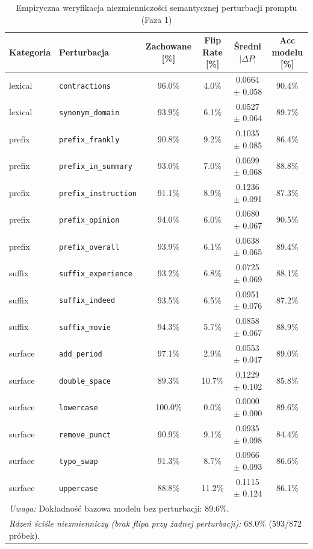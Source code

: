 \begin{table}[htbp]
\centering
\caption{Empiryczna weryfikacja niezmienniczości semantycznej perturbacji promptu (Faza 1)}
\label{tab:perturbation_validation}
\begin{tabular}{llcccc}
\hline
\textbf{Kategoria} & \textbf{Perturbacja} & \textbf{Zachowane [\%]} & \textbf{Flip Rate [\%]} & \textbf{Średni $|\Delta P|$} & \textbf{Acc modelu [\%]} \\
\hline
lexical & \texttt{contractions} & 96.0\% & 4.0\% & 0.0664 $\pm$ 0.058 & 90.4\% \\
lexical & \texttt{synonym\_domain} & 93.9\% & 6.1\% & 0.0527 $\pm$ 0.064 & 89.7\% \\
prefix & \texttt{prefix\_frankly} & 90.8\% & 9.2\% & 0.1035 $\pm$ 0.085 & 86.4\% \\
prefix & \texttt{prefix\_in\_summary} & 93.0\% & 7.0\% & 0.0699 $\pm$ 0.068 & 88.8\% \\
prefix & \texttt{prefix\_instruction} & 91.1\% & 8.9\% & 0.1236 $\pm$ 0.091 & 87.3\% \\
prefix & \texttt{prefix\_opinion} & 94.0\% & 6.0\% & 0.0680 $\pm$ 0.067 & 90.5\% \\
prefix & \texttt{prefix\_overall} & 93.9\% & 6.1\% & 0.0638 $\pm$ 0.065 & 89.4\% \\
suffix & \texttt{suffix\_experience} & 93.2\% & 6.8\% & 0.0725 $\pm$ 0.069 & 88.1\% \\
suffix & \texttt{suffix\_indeed} & 93.5\% & 6.5\% & 0.0951 $\pm$ 0.076 & 87.2\% \\
suffix & \texttt{suffix\_movie} & 94.3\% & 5.7\% & 0.0858 $\pm$ 0.067 & 88.9\% \\
surface & \texttt{add\_period} & 97.1\% & 2.9\% & 0.0553 $\pm$ 0.047 & 89.0\% \\
surface & \texttt{double\_space} & 89.3\% & 10.7\% & 0.1229 $\pm$ 0.102 & 85.8\% \\
surface & \texttt{lowercase} & 100.0\% & 0.0\% & 0.0000 $\pm$ 0.000 & 89.6\% \\
surface & \texttt{remove\_punct} & 90.9\% & 9.1\% & 0.0935 $\pm$ 0.098 & 84.4\% \\
surface & \texttt{typo\_swap} & 91.3\% & 8.7\% & 0.0966 $\pm$ 0.093 & 86.6\% \\
surface & \texttt{uppercase} & 88.8\% & 11.2\% & 0.1115 $\pm$ 0.124 & 86.1\% \\
\hline
\multicolumn{6}{l}{\footnotesize \textit{Uwaga:} Dokładność bazowa modelu bez perturbacji: 89.6\%.} \\
\multicolumn{6}{l}{\footnotesize \textit{Rdzeń ściśle niezmienniczy (brak flipa przy żadnej perturbacji):} 68.0\% (593/872 próbek).} \\
\end{tabular}
\end{table}